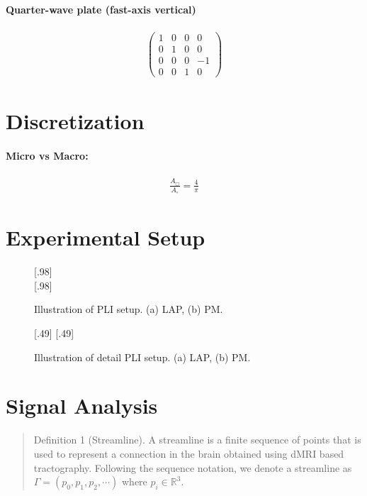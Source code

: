 \paragraph{Quarter-wave plate (fast-axis vertical)}
\begin{align}
\begin{pmatrix}
    1 & 0 & 0 &  0 \\
    0 & 1 & 0 &  0 \\
    0 & 0 & 0 & -1 \\
    0 & 0 & 1 &  0
\end{pmatrix}
\end{align}
% 
\section{Discretization}
\paragraph{Micro vs Macro:}
% 
\begin{align}
    \frac{A_{\Box}}{A_{\circ}} = \frac{4}{\pi}
\end{align}
% 
\section{Experimental Setup}
%
\begin{figure}[!tb]
	\centering
	\subcaptionbox{}[.98\textwidth]{
		}\\[1cm]
	\subcaptionbox{}[.98\textwidth]{
		}
	\label{fig:pli_setup}
	\caption{Illustration of PLI setup. (a) LAP, (b) PM.}
\end{figure}
%
\begin{figure}[!tb]
	\centering
	\subcaptionbox{}[.49\textwidth]{
    }
	\subcaptionbox{}[.49\textwidth]{
    }
	\label{fig:pli_detail}
	\caption{Illustration of detail PLI setup. (a) LAP, (b) PM.}
\end{figure}
%
% 
\section{Signal Analysis}
% 
\begin{quote}
Definition 1 (Streamline).
A streamline is a finite sequence of points that is used to represent a connection in the brain obtained using dMRI based tractography.
Following the sequence notation, we denote a streamline as $\Gamma = (p_0, p_1, p_2, \cdots )$ where $p_i \in \mathbb{R}^3$. %
\end{quote}

